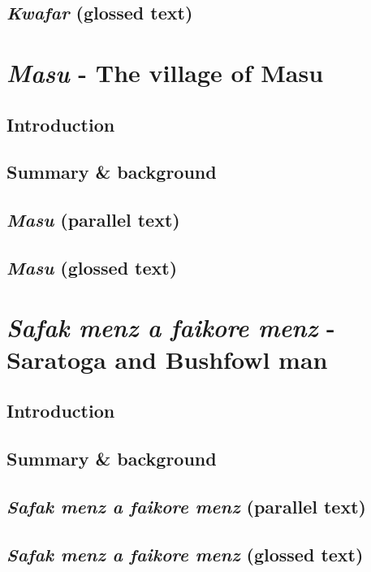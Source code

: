 \documentclass[output=book,
		  ]{langscibook}
\begin{document}
\section{\textit{Kwafar} (glossed text)}
    

\chapter{\textit{Masu} - The village of Masu}\label{text:masu}
\section{Introduction}
    
    \vspace{-.3cm}
\section{Summary \& background}
    
    \vspace{-.3cm}
\section{\textit{Masu} (parallel text)}
    
    \newpage
\section{\textit{Masu} (glossed text)}
    

\chapter{\textit{Safak menz a faikore menz} - Saratoga and Bushfowl man}\label{text:safakfaikore}
\section{Introduction}
    
\section{Summary \& background}
    
\section{\textit{Safak menz a faikore menz} (parallel text)}
    
    \newpage
\section{\textit{Safak menz a faikore menz} (glossed text)}
    
\end{document}
